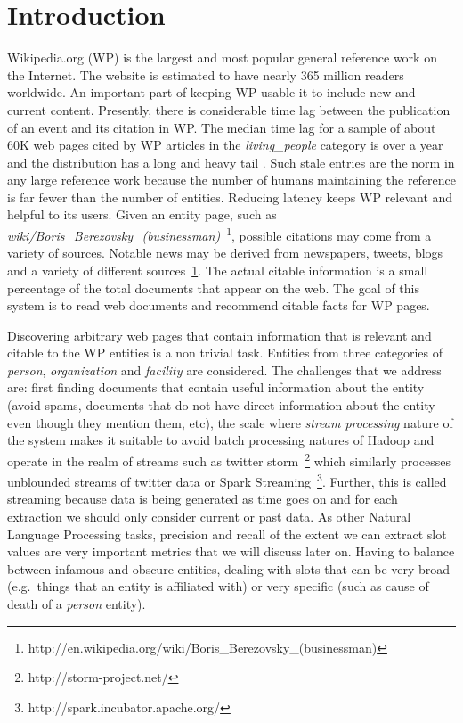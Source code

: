 
\section{Introduction}

Wikipedia.org (WP) is the largest and most popular general reference work on the Internet.
The website is estimated to have nearly 365 million readers worldwide.
An important part of keeping WP usable it to include new and current content.
Presently, there is considerable time lag between the publication of an event and its citation in WP\@.
The median time lag for a sample of about 60K web pages cited by WP articles in the \textit{living\_people} category is over a year and the distribution has a long and heavy tail \cite{JFrank12}.
Such stale entries are the norm in any large reference work because the number
of humans maintaining the reference is far fewer than the number of entities.
Reducing latency keeps WP relevant and helpful to its users.
Given an entity page, such as \textit{wiki/Boris_Berezovsky_(businessman)}~\footnote{http://en.wikipedia.org/wiki/Boris_Berezovsky_(businessman)},
possible citations may come from a variety of sources.
Notable news may be derived from newspapers, tweets, blogs and a variety of different sources~\ref{}.
The actual citable information is a small percentage of the total documents that appear on the web.
The goal of this system is to read web documents and recommend citable facts for WP pages.


Discovering arbitrary web pages that contain information that is relevant and citable 
to the WP entities is a non trivial task.
Entities from three categories of \textit{person}, \textit{organization} and \textit{facility} are considered.
The challenges that we address are: first finding documents that contain useful information about the entity (avoid spams, documents that do not have direct information about the entity even though they mention them, etc), the scale where \textit{stream processing} nature of the system makes it suitable to avoid batch processing natures of Hadoop and operate in the realm of streams such as twitter storm~\footnote{http://storm-project.net/} which similarly processes unblounded streams of twitter data or Spark Streaming~\footnote{http://spark.incubator.apache.org/}. Further, this is called streaming because data is being generated as time goes
on and for each extraction we should only consider current or past data. As other Natural Language Processing tasks, precision and recall of the extent we can extract slot values are very important metrics that we will discuss later on. Having to balance between infamous and obscure entities, dealing with slots that can be very broad (e.g.\ things that an entity is affiliated with) or very specific (such as cause of death of a \textit{person} entity).

